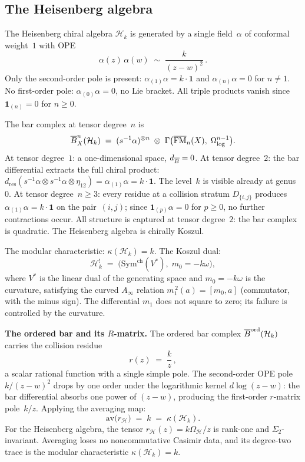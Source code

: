 \subsection*{The Heisenberg algebra}

The Heisenberg chiral algebra $\mathcal H_k$ is generated by a
single field~$\alpha$ of conformal weight~$1$ with OPE
\[
\alpha(z)\,\alpha(w)
\;\sim\;
\frac{k}{(z-w)^2}\,.
\]
Only the second-order pole is present: $\alpha_{(1)}\alpha
= k\cdot\mathbf 1$ and $\alpha_{(n)}\alpha = 0$ for $n\neq 1$.
No first-order pole: $\alpha_{(0)}\alpha = 0$, no Lie bracket.
All triple products vanish since
$\mathbf 1_{(n)} = 0$ for $n\ge 0$.

The bar complex at tensor degree~$n$ is
\[
\overline{B}^n_X(\mathcal H_k)
\;=\;
(s^{-1}\alpha)^{\otimes n}
\;\otimes\;
\Gamma\bigl(\overline{\mathrm{FM}}_n(X),\;
\Omega^{n-1}_{\log}\bigr).
\]
At tensor degree~$1$: a one-dimensional space, $d_{\overline{B}} = 0$.
At tensor degree~$2$: the bar differential extracts the full
chiral product:
$d_{\mathrm{res}}(s^{-1}\alpha\otimes s^{-1}\alpha
\otimes\eta_{12}) = \alpha_{(1)}\alpha = k\cdot\mathbf{1}$.
The level~$k$ is visible already at genus~$0$. At tensor
degree~$n \ge 3$: every residue at a collision stratum
$D_{\{i,j\}}$ produces $\alpha_{(1)}\alpha
= k\cdot\mathbf 1$ on the pair~$(i,j)$; since
$\mathbf 1_{(p)}\alpha = 0$ for $p\ge 0$, no further
contractions occur. All structure is captured at tensor
degree~$2$: the bar complex is quadratic.
The Heisenberg algebra is chirally Koszul.

The modular characteristic:
$\kappa(\mathcal H_k) = k$.
The Koszul dual:
\[
\mathcal H_k^!
\;=\;
\bigl(\mathrm{Sym}^{\mathrm{ch}}(V^*),\;
m_0 = -k\omega\bigr),
\]
where $V^*$ is the linear dual of the generating space and
$m_0 = -k\omega$ is the curvature, satisfying the curved
$A_\infty$ relation $m_1^{\,2}(a) = [m_0, a]$ (commutator,
with the minus sign). The differential $m_1$ does not square to
zero; its failure is controlled by the curvature.

\medskip
\noindent\textbf{The ordered bar and its $R$-matrix.}\enspace
The ordered bar complex $\overline{B}^{\mathrm{ord}}(\mathcal H_k)$
carries the collision residue
\begin{equation}\label{eq:pf1-heis-rmatrix}
r(z) \;=\; \frac{k}{z}\,,
\end{equation}
a scalar rational function with a single simple pole. The
second-order OPE pole $k/(z-w)^2$ drops by one order under the
logarithmic kernel $d\log(z-w)$: the bar differential absorbs one
power of $(z-w)$, producing the first-order $r$-matrix pole~$k/z$.
Applying the averaging map:
\[
\mathrm{av}\bigl(r_{\mathcal H}\bigr) \;=\; k
\;=\; \kappa(\mathcal H_k).
\]
For the Heisenberg algebra, the tensor
$r_{\mathcal H}(z)=k\Omega_{\mathcal H}/z$ is rank-one and
$\Sigma_2$-invariant. Averaging loses no noncommutative Casimir data,
and its degree-two trace is the modular characteristic
$\kappa(\mathcal H_k)=k$.

